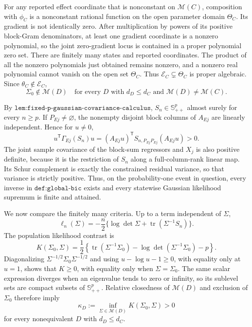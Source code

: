 For any reported effect coordinate that is nonconstant on \(\mathcal M(C)\), composition with \(\phi_C\) is a nonconstant rational function on the open parameter domain \(\Theta_C\). Its gradient is not identically zero. After multiplication by powers of its positive block-Gram denominators, at least one gradient coordinate is a nonzero polynomial, so the joint zero-gradient locus is contained in a proper polynomial zero set. There are finitely many states and reported coordinates. The product of all the nonzero polynomials just obtained remains nonzero, and a nonzero real polynomial cannot vanish on the open set \(\Theta_C\). Thus \(\mathcal E_C\subsetneq\Theta_C\) is proper algebraic. Since \(\theta_C\notin\mathcal E_C\),
\[
 \Sigma_0\notin\mathcal M(D)
 \quad\text{for every }D\text{ with }d_D\leq d_C
 \text{ and }\mathcal M(D)\neq\mathcal M(C).
\]

By \(\texttt{lem:fixed-p-gaussian-covariance-calculus}\), \(S_n\in\mathbb S^p_{++}\) almost surely for every \(n\geq p\). If \(P_{Ej}\neq\varnothing\), the nonempty disjoint block columns of \(A_{Ej}\) are linearly independent. Hence for \(u\neq0\),
\[
 u^{\mathsf T}\Gamma_{Ej}(S_n)u
 =(A_{Ej}u)^{\mathsf T}S_{n,P_{Ej}P_{Ej}}(A_{Ej}u)>0.
\]
The joint sample covariance of the block-sum regressors and \(X_j\) is also positive definite, because it is the restriction of \(S_n\) along a full-column-rank linear map. Its Schur complement is exactly the constrained residual variance, so that variance is strictly positive. Thus, on the probability-one event in question, every inverse in \(\texttt{def:global-bic}\) exists and every statewise Gaussian likelihood supremum is finite and attained.

We now compare the finitely many criteria. Up to a term independent of \(\Sigma\),
\[
 \ell_n(\Sigma)=-\frac n2\{\log\det\Sigma+\operatorname{tr}(\Sigma^{-1}S_n)\}.
\]
The population likelihood contrast is
\[
 K(\Sigma_0,\Sigma)=\frac12\left\{
 \operatorname{tr}(\Sigma^{-1}\Sigma_0)
 -\log\det(\Sigma^{-1}\Sigma_0)-p\right\}.
\]
Diagonalizing \(\Sigma^{-1/2}\Sigma_0\Sigma^{-1/2}\) and using \(u-\log u-1\geq0\), with equality only at \(u=1\), shows that \(K\geq0\), with equality only when \(\Sigma=\Sigma_0\). The same scalar expression diverges when an eigenvalue tends to zero or infinity, so its sublevel sets are compact subsets of \(\mathbb S^p_{++}\). Relative closedness of \(\mathcal M(D)\) and exclusion of \(\Sigma_0\) therefore imply
\[
 \kappa_D:=\inf_{\Sigma\in\mathcal M(D)}K(\Sigma_0,\Sigma)>0
\]
for every nonequivalent \(D\) with \(d_D\leq d_C\).

